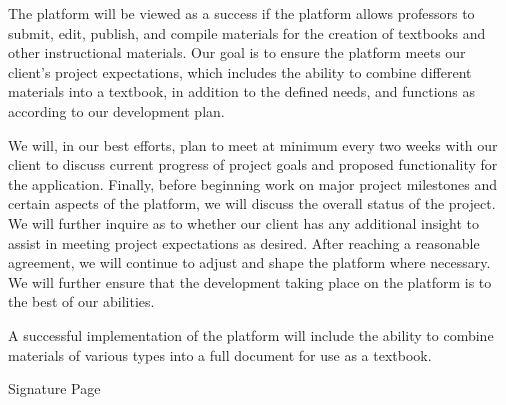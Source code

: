\documentclass[letterpaper, 10pt, draftclsnofoot, onecolumn, compsoc]{IEEEtran}
\begin{document}
{\noindent The platform will be viewed as a success if the platform 
allows professors to submit, edit, publish, and compile materials for 
the creation of textbooks and other instructional materials. 
Our goal is to ensure the platform meets our client's project 
expectations, which includes the ability to combine different materials
into a textbook, in addition to the defined needs, 
and functions as according to our development plan. 

\noindent We will, in our best efforts, plan to meet at minimum every two weeks 
with our client to discuss current progress of project goals and 
proposed functionality for the application. 
Finally, before beginning work on major project milestones and certain 
aspects of the platform, we will discuss the overall status of the 
project. We will further inquire as to whether our client has any additional 
insight to assist in meeting project expectations as desired. 
After reaching a reasonable agreement, we will continue to adjust and 
shape the platform where necessary. 
We will further ensure that the development taking place on the platform 
is to the best of our abilities.

\noindent A successful implementation of the platform will include the ability 
to combine materials of various types into a full document for use as a textbook.\par}

\medskip

\newpage



\newpage
\centerline{\sc \large Signature Page}
\vspace{5pc}


\centering
\end{document}

